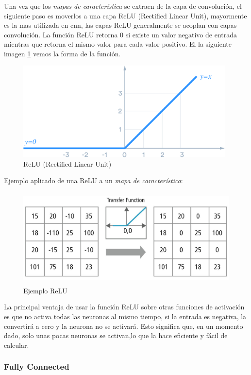 Una vez que los \textit{mapas de característica} se extraen de la capa de convolución, el siguiente paso es moverlos a una capa ReLU (Rectified Linear Unit), mayormente es la mas utilizada en \ac{cnn}, las capas ReLU generalmente se acoplan con capas convolución. La función ReLU retorna 0 si existe un valor negativo de entrada mientras que retorna el mismo valor para cada valor positivo. El la siguiente imagen \ref{Fig:relu} vemos la forma de la función.

\begin{figure}[H]
 \centering
  \includegraphics[height=5cm,keepaspectratio=true,clip=true]{imagenes/MarcoTeorico/ReLU_1.png}
  \caption{ReLU (Rectified Linear Unit)} \label{Fig:relu}
\end{figure}

Ejemplo aplicado de una ReLU a un \textit{mapa de característica}:
\begin{figure}[H]
 \centering
  \includegraphics[height=5cm,keepaspectratio=true,clip=true]{imagenes/MarcoTeorico/ReLU_2.jpeg}
  \caption{Ejemplo ReLU } \label{Fig:relu2}
\end{figure}

La principal ventaja de usar la función ReLU sobre otras funciones de activación es que no activa todas las neuronas al mismo tiempo, si la entrada es negativa, la convertirá a cero y la neurona no se activará. Esto significa que, en un momento dado, solo unas pocas neuronas se activan,lo que la hace eficiente y fácil de calcular.


\subsubsection{Fully Connected}\label{sub:fully_connected}

